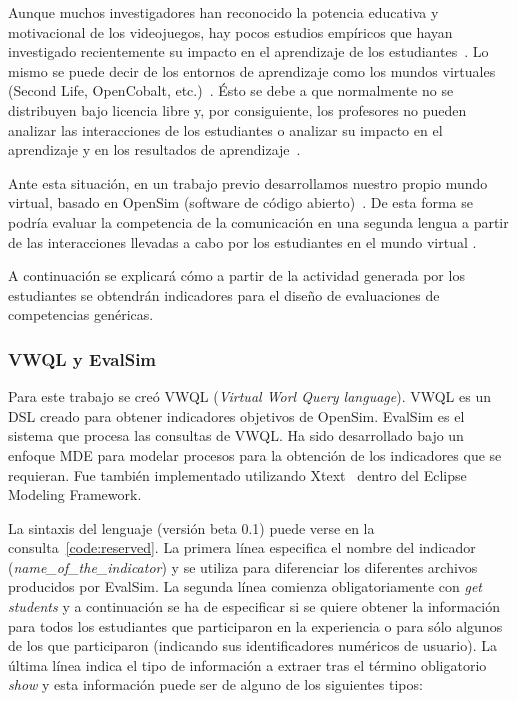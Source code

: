 Aunque muchos investigadores han reconocido la potencia educativa y motivacional de los videojuegos, hay pocos estudios empíricos que hayan investigado recientemente su impacto en el aprendizaje de los estudiantes~\cite{berns2013game}. Lo mismo se puede decir de los entornos de aprendizaje como los mundos virtuales (Second Life, OpenCobalt, etc.)~\cite{hew2010use}. Ésto se debe a que normalmente no se distribuyen bajo licencia libre y, por consiguiente, los profesores no pueden analizar las interacciones de los estudiantes o analizar su impacto en el aprendizaje y en los resultados de aprendizaje~\cite{cruz2015discovering,moreno2014serious}. 

Ante esta situación, en un trabajo previo desarrollamos nuestro propio mundo virtual, basado en OpenSim (software de código abierto)~\cite{berns2013using}. De esta forma se podría evaluar la competencia de la comunicación en una segunda lengua a partir de las interacciones llevadas a cabo por los estudiantes en el mundo virtual . 

A continuación se explicará cómo a partir de la actividad generada por los estudiantes se obtendrán indicadores para el diseño de evaluaciones de competencias genéricas.

\subsubsection{VWQL y EvalSim}

Para este trabajo se creó VWQL (\emph{Virtual Worl Query language}). VWQL es un DSL creado para obtener indicadores objetivos de OpenSim. EvalSim es el sistema que procesa las consultas de VWQL. Ha sido desarrollado bajo un enfoque MDE para modelar procesos para la obtención de los indicadores que se requieran. Fue también implementado utilizando Xtext~\cite{eysholdt2010xtext} dentro del Eclipse Modeling Framework.

La sintaxis del lenguaje (versión beta 0.1) puede verse en la consulta~\ref{code:reserved}. La primera línea especifica el nombre del indicador (\emph{name\_of\_the\_indicator}) y se utiliza para diferenciar los diferentes archivos producidos por EvalSim. La segunda línea comienza obligatoriamente con \emph{get students} y a continuación se ha de especificar si se quiere obtener la información para todos los estudiantes que participaron en la experiencia o para sólo algunos de los que participaron (indicando sus identificadores numéricos de usuario). La última línea indica el tipo de información a extraer tras el término obligatorio \emph{show} y esta información puede ser de alguno de los siguientes tipos:

